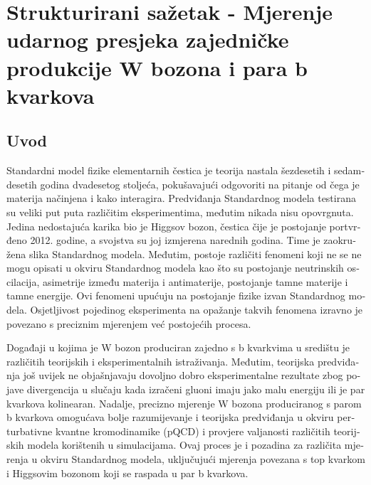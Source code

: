
\chapter{Strukturirani sažetak - Mjerenje udarnog presjeka zajedničke produkcije W bozona i para b kvarkova} %

\label{Chapter9} %

\begin{otherlanguage}{croatian}

\section{Uvod}
Standardni model fizike elementarnih čestica je teorija nastala šezdesetih i sedamdesetih godina dvadesetog stoljeća, pokušavajući odgovoriti na pitanje od čega je materija načinjena i kako interagira. Predviđanja Standardnog modela testirana su veliki put puta različitim eksperimentima, međutim nikada nisu opovrgnuta. Jedina nedostajuća karika bio je Higgsov bozon, čestica čije je postojanje portvrđeno 2012. godine, a svojstva su joj izmjerena narednih godina. Time je zaokružena slika Standardnog modela. Međutim, postoje različiti fenomeni koji ne se ne mogu opisati u okviru Standardnog modela kao što su postojanje neutrinskih oscilacija, asimetrije između materija i antimaterije, postojanje tamne materije i tamne energije. Ovi fenomeni upućuju na postojanje fizike izvan Standardnog modela. Osjetljivost pojedinog eksperimenta na opažanje takvih fenomena izravno je povezano s preciznim mjerenjem već postojećih procesa. 

Događaji u kojima je W bozon produciran zajedno s b kvarkvima u središtu je različitih teorijskih i eksperimentalnih istraživanja. Međutim, teorijska predviđanja još uvijek ne objašnjavaju dovoljno dobro  eksperimentalne rezultate zbog pojave divergencija u slučaju kada izračeni gluoni imaju jako malu energiju ili je par kvarkova kolinearan. Nadalje, precizno mjerenje W bozona produciranog s parom b kvarkova omogućava bolje razumijevanje i teorijska predviđanja u okviru perturbativne kvantne kromodinamike (pQCD) i provjere valjanosti različitih teorijskih modela korištenih u simulacijama. Ovaj proces je i pozadina za različita mjerenja u okviru Standardnog modela, uključujući mjerenja povezana s top kvarkom i Higgsovim bozonom koji se raspada u par b kvarkova. 


\end{otherlanguage}
